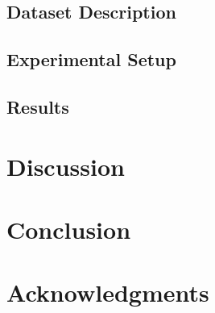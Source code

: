 \documentclass{article}
\begin{document}

\subsection{Dataset Description}


\subsection{Experimental Setup}


\subsection{Results}


\section{Discussion}


\section{Conclusion}


\section*{Acknowledgments}



\end{document}
